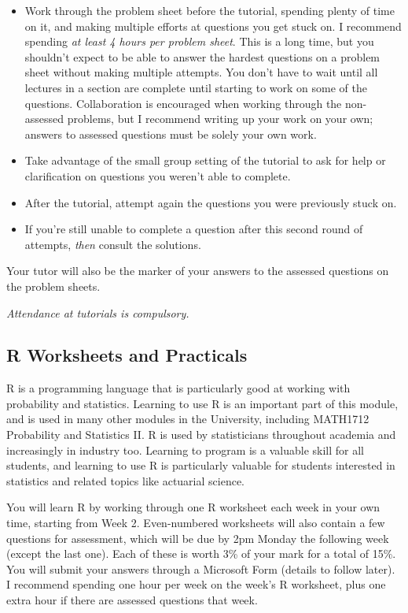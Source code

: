 \documentclass[
  a4paper,
]{book}
\providecommand{\tightlist}{%
  \setlength{\itemsep}{0pt}\setlength{\parskip}{0pt}}
\theoremstyle{definition}
\theoremstyle{definition}
\theoremstyle{definition}
\theoremstyle{definition}
\theoremstyle{remark}
\begin{document}
\begin{itemize}
\tightlist
\item
  Work through the problem sheet before the tutorial, spending plenty of time on it, and making multiple efforts at questions you get stuck on. I recommend spending \emph{at least 4 hours per problem sheet}. This is a long time, but you shouldn't expect to be able to answer the hardest questions on a problem sheet without making multiple attempts. You don't have to wait until all lectures in a section are complete until starting to work on some of the questions. Collaboration is encouraged when working through the non-assessed problems, but I recommend writing up your work on your own; answers to assessed questions must be solely your own work.
\item
  Take advantage of the small group setting of the tutorial to ask for help or clarification on questions you weren't able to complete.
\item
  After the tutorial, attempt again the questions you were previously stuck on.
\item
  If you're still unable to complete a question after this second round of attempts, \emph{then} consult the solutions.
\end{itemize}

Your tutor will also be the marker of your answers to the assessed questions on the problem sheets.

\emph{Attendance at tutorials is compulsory.}

\hypertarget{r-worksheets}{%
\subsection*{R Worksheets and Practicals}\label{r-worksheets}}

R is a programming language that is particularly good at working with probability and statistics. Learning to use R is an important part of this module, and is used in many other modules in the University, including MATH1712 Probability and Statistics II. R is used by statisticians throughout academia and increasingly in industry too. Learning to program is a valuable skill for all students, and learning to use R is particularly valuable for students interested in statistics and related topics like actuarial science.

You will learn R by working through one R worksheet each week in your own time, starting from Week 2. Even-numbered worksheets will also contain a few questions for assessment, which will be due by 2pm Monday the following week (except the last one). Each of these is worth 3\% of your mark for a total of 15\%. You will submit your answers through a Microsoft Form (details to follow later). I recommend spending one hour per week on the week's R worksheet, plus one extra hour if there are assessed questions that week.
\end{document}
